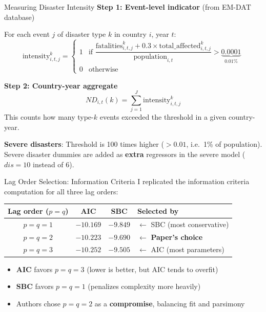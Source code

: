 \documentclass[10pt, aspectratio=169]{beamer}
\begin{document}
\begin{frame}{Measuring Disaster Intensity}
\textbf{Step 1: Event-level indicator} (from EM-DAT database)

For each event $j$ of disaster type $k$ in country $i$, year $t$:
\[
\text{intensity}^k_{i,t,j} =
\begin{cases}
1 & \text{if } \dfrac{\text{fatalities}^k_{i,t,j} + 0.3 \times \text{total\_affected}^k_{i,t,j}}{\text{population}_{i,t}} > \underbrace{0.0001}_{\text{0.01\%}} \\[6pt]
0 & \text{otherwise}
\end{cases}
\]

\textbf{Step 2: Country-year aggregate}
\[
ND_{i,t}(k) = \sum_{j=1}^{J} \text{intensity}^k_{i,t,j}
\]
This counts how many type-$k$ events exceeded the threshold in a given country-year.

\vspace{0.3em}
\textbf{Severe disasters}: Threshold is 100 times higher ($> 0.01$, i.e.\ 1\% of population). Severe disaster dummies are added as \textbf{extra} regressors in the severe model ($dis = 10$ instead of 6).
\end{frame}

\begin{frame}{Lag Order Selection: Information Criteria}
I replicated the information criteria computation for all three lag orders:

\vspace{0.3em}
\begin{table}[h]
\centering
\begin{tabular}{c cc l}
\toprule
\textbf{Lag order ($p = q$)} & \textbf{AIC} & \textbf{SBC} & \textbf{Selected by} \\
\midrule
$p = q = 1$ & $-10.169$ & $\mathbf{-9.849}$ & $\leftarrow$ SBC (most conservative) \\
$p = q = 2$ & $-10.223$ & $-9.690$ & $\leftarrow$ \textbf{Paper's choice} \\
$p = q = 3$ & $\mathbf{-10.252}$ & $-9.505$ & $\leftarrow$ AIC (most parameters) \\
\bottomrule
\end{tabular}
\vspace{0.3em}
\end{table}

\vspace{0.2em}
\begin{itemize}
    \item \textbf{AIC} favors $p = q = 3$ (lower is better, but AIC tends to overfit)
    \item \textbf{SBC} favors $p = q = 1$ (penalizes complexity more heavily)
    \item Authors chose $p = q = 2$ as a \textbf{compromise}, balancing fit and parsimony
\end{itemize}
\end{frame}
\end{document}
